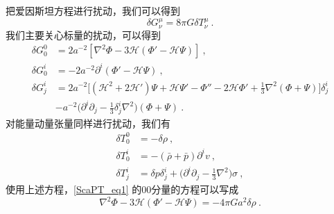 把爱因斯坦方程进行扰动，我们可以得到
\begin{equation}\label{ScaPT_eq1}
\delta G^\mu_\nu = 8 \pi G\delta T^\mu_\nu ~.
\end{equation}
我们主要关心标量的扰动，可以得到
\begin{equation}
\begin{aligned}
\delta G^0_0 & = 2 a^{-2} [\nabla^2 \Phi- 3 \mathcal H(\Phi' - \mathcal H \Psi)] ~,  \\
\delta G^i_0 & = - 2 a^{-2} \partial^i(\Phi' - \mathcal H \Psi)~, \\
\delta G^i_j &= 2 a^{-2} \bigg[ (\mathcal H^2 + 2 \mathcal H')\Psi +\mathcal H \Psi' - \Phi'' - 2 \mathcal H \Phi' + \frac{1}{3} \nabla^2 (\Phi+\Psi)  \bigg] \delta^i_j \\
& - a^{-2} \bigg( \partial^i\partial_j - \frac{1}{3} \delta^i_j \nabla^2 \bigg) (\Phi+\Psi) ~.
\end{aligned}
\end{equation}
对能量动量张量同样进行扰动，我们有
\begin{equation}
\begin{aligned}
\delta T^0_0 & = - \delta \rho~, \\
\delta T^i_0 & = - (\bar \rho +\bar p) \partial^i v~, \\
\delta T^i_j & = \delta p \delta^i_j + \bigg( \partial^i\partial_j - \frac{1}{3} \nabla^2 \bigg) \sigma ~,
\end{aligned}
\end{equation}
使用上述方程，\autoref{ScaPT_eq1} 的00分量的方程可以写成
\begin{equation}
\nabla^2 \Phi - 3 \mathcal H (\Phi' - \mathcal H\Psi) = - 4 \pi G a^2 \delta \rho~. 
\end{equation}

